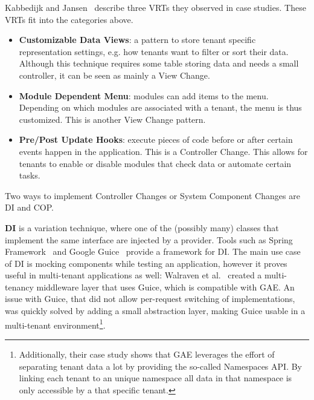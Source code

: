 Kabbedijk and Jansen~\cite{kabbedijk2011variability} describe three \acp{VRT} they observed in case studies. These \acp{VRT}  fit into the categories above.
\begin{itemize} 
\item \textbf{Customizable Data Views}: a pattern to store tenant specific representation settings, e.g. how tenants want to filter or sort their data. 
Although this technique requires some table storing data and needs a small controller, it can be seen as mainly a View Change.
\item \textbf{Module Dependent Menu}: modules can add items to the menu. Depending on which modules are associated with a tenant, the menu is thus customized. This is another View Change pattern. 
\item \textbf{Pre/Post Update Hooks}: execute pieces of code before or after certain events happen in the application. This is a Controller Change. 
This allows for tenants to enable or disable modules that check data or automate certain tasks.
\end{itemize}

Two ways to implement Controller Changes or System Component Changes are \acl{DI} and \acl{COP}.

\textbf{\acf{DI}} is a variation technique, where one of the (possibly many) classes that implement the same interface are injected by a provider. Tools such as Spring Framework~\cite{walls2005spring} and Google Guice~\cite{vanbrabant2008google} provide a framework for \ac{DI}. The main use case of \ac{DI} is mocking components while testing an application, however it proves useful in multi-tenant applications as well:
Walraven et al.~\cite{walraven2011middleware} created a multi-tenancy middleware layer that uses Guice, which is compatible with \acf{GAE}. An issue with Guice, that did not allow per-request switching of implementations, was quickly solved by adding a small abstraction layer, making Guice usable in a multi-tenant environment\footnote{
Additionally, their case study shows that \ac{GAE} leverages the effort of separating tenant data a lot by providing the so-called Namespaces API. By linking each tenant to an unique namespace all data in that namespace is only accessible by a that specific tenant.}.

